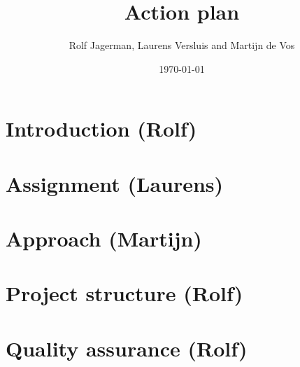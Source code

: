 \documentclass{article}
\title{Action plan}
\author{Rolf Jagerman, Laurens Versluis and Martijn de Vos}
\date{\today}
\begin{document}
\maketitle

\section{Introduction (Rolf)}

\section{Assignment (Laurens)}

\section{Approach (Martijn)}

\section{Project structure (Rolf)}

\section{Quality assurance (Rolf)}
\end{document}
